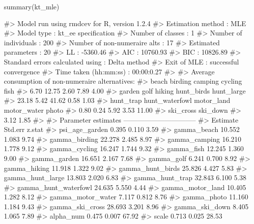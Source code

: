 \begin{Schunk}
\begin{Sinput}
summary(kt_mle)
\end{Sinput}
\begin{Soutput}
#> Model run using rmdcev for R, version 1.2.4 
#> Estimation method                : MLE
#> Model type                       : kt_ee specification
#> Number of classes                : 1
#> Number of individuals            : 200
#> Number of non-numeraire alts     : 17
#> Estimated parameters             : 20
#> LL                               : -5360.46
#> AIC                              : 10760.93
#> BIC                              : 10826.89
#> Standard errors calculated using : Delta method
#> Exit of MLE                      : successful convergence
#> Time taken (hh:mm:ss)            : 00:00:0.27
#> 
#> Average consumption of non-numeraire alternatives:
#>          beach        birding        camping        cycling           fish 
#>           6.70          12.75           2.60           7.89           4.00 
#>         garden           golf         hiking     hunt_birds     hunt_large 
#>          23.18           5.42          41.62           0.58           1.03 
#>      hunt_trap hunt_waterfowl     motor_land    motor_water          photo 
#>           0.80           0.24           5.92           3.53          11.00 
#>      ski_cross       ski_down 
#>           3.12           1.85 
#> 
#> Parameter estimates --------------------------------  
#>                      Estimate Std.err z.stat
#> psi_age_garden          0.395   0.110   3.59
#> gamma_beach            10.552   1.083   9.74
#> gamma_birding          22.278   2.485   8.97
#> gamma_camping          16.210   1.778   9.12
#> gamma_cycling          16.247   1.744   9.32
#> gamma_fish             12.245   1.360   9.00
#> gamma_garden           16.651   2.167   7.68
#> gamma_golf              6.241   0.700   8.92
#> gamma_hiking           11.918   1.322   9.02
#> gamma_hunt_birds       25.826   4.427   5.83
#> gamma_hunt_large       13.803   2.020   6.83
#> gamma_hunt_trap        32.843   6.100   5.38
#> gamma_hunt_waterfowl   24.635   5.550   4.44
#> gamma_motor_land       10.405   1.282   8.12
#> gamma_motor_water       7.117   0.812   8.76
#> gamma_photo            11.160   1.184   9.43
#> gamma_ski_cross        28.693   3.201   8.96
#> gamma_ski_down          8.405   1.065   7.89
#> alpha_num               0.475   0.007  67.92
#> scale                   0.713   0.025  28.53
\end{Soutput}
\end{Schunk}

